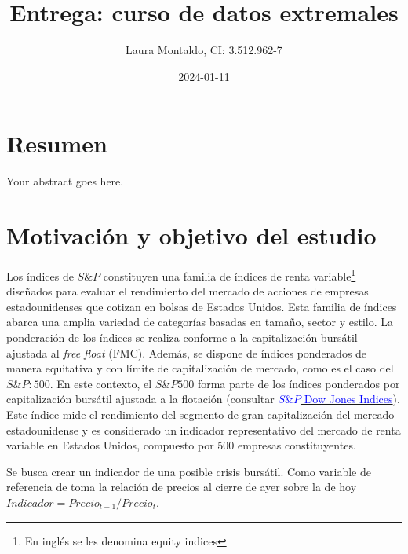 \documentclass[
  12pt]{article}
\title{Entrega: curso de datos extremales}
\author{Laura Montaldo, CI: 3.512.962-7}
\date{2024-01-11}
\begin{document}
\maketitle

\newpage

\thispagestyle{empty}

\maketitle

\newpage

\tableofcontents

\newpage

\hypertarget{resumen}{%
\section{Resumen}\label{resumen}}

Your abstract goes here.

\newpage

\hypertarget{motivaciuxf3n-y-objetivo-del-estudio}{%
\section{Motivación y objetivo del
estudio}\label{motivaciuxf3n-y-objetivo-del-estudio}}

Los índices de \(S\&P\) constituyen una familia de índices de renta
variable\footnote{En inglés se les denomina equity indices} diseñados
para evaluar el rendimiento del mercado de acciones de empresas
estadounidenses que cotizan en bolsas de Estados Unidos. Esta familia de
índices abarca una amplia variedad de categorías basadas en tamaño,
sector y estilo. La ponderación de los índices se realiza conforme a la
capitalización bursátil ajustada al \textit{free float} (FMC). Además,
se dispone de índices ponderados de manera equitativa y con límite de
capitalización de mercado, como es el caso del \(S\&P:500\). En este
contexto, el \(S\&P 500\) forma parte de los índices ponderados por
capitalización bursátil ajustada a la flotación (consultar
\href{http://www.overleaf.com}{\textcolor{blue}{$S\&P$ Dow Jones Indices}}).
Este índice mide el rendimiento del segmento de gran capitalización del
mercado estadounidense y es considerado un indicador representativo del
mercado de renta variable en Estados Unidos, compuesto por 500 empresas
constituyentes.

Se busca crear un indicador de una posible crisis bursátil. Como
variable de referencia de toma la relación de precios al cierre de ayer
sobre la de hoy \(Indicador=Precio_{t-1}/Precio_t\).
\end{document}
